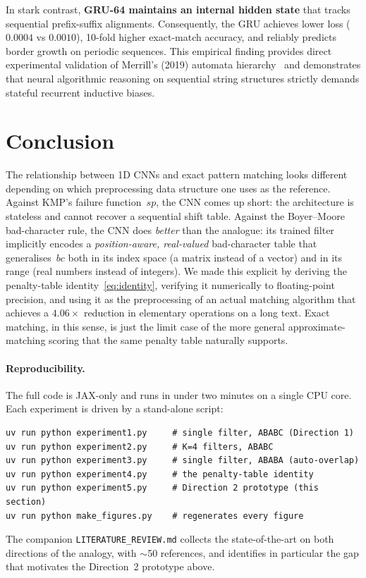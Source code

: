 \documentclass[11pt,a4paper]{article}
\begin{document}
In stark contrast, \textbf{GRU-64 maintains an internal hidden state} that tracks sequential prefix-suffix alignments. Consequently, the GRU achieves lower loss ($0.0004$ vs $0.0010$), 10-fold higher exact-match accuracy, and reliably predicts border growth on periodic sequences. This empirical finding provides direct experimental validation of Merrill's (2019) automata hierarchy~\cite{Merrill2019} and demonstrates that neural algorithmic reasoning on sequential string structures strictly demands stateful recurrent inductive biases.

\section{Conclusion}
\label{sec:concl}

The relationship between 1D CNNs and exact pattern matching looks
different depending on which preprocessing data structure one uses as
the reference. Against KMP's failure function~$sp$, the CNN comes up
short: the architecture is stateless and cannot recover a sequential
shift table. Against the Boyer--Moore bad-character rule, the CNN does
\emph{better} than the analogue: its trained filter implicitly
encodes a \emph{position-aware, real-valued} bad-character table that
generalises~$bc$ both in its index space (a matrix instead of a vector)
and in its range (real numbers instead of integers). We made this
explicit by deriving the penalty-table identity~\eqref{eq:identity},
verifying it numerically to floating-point precision, and using it as
the preprocessing of an actual matching algorithm that achieves a
$4.06\times$ reduction in elementary operations on a long text. Exact
matching, in this sense, is just the limit case of the more general
approximate-matching scoring that the same penalty table naturally
supports.

\paragraph{Reproducibility.}
The full code is JAX-only and runs in under two minutes on a single
CPU core. Each experiment is driven by a stand-alone script:
\begin{verbatim}
uv run python experiment1.py     # single filter, ABABC (Direction 1)
uv run python experiment2.py     # K=4 filters, ABABC
uv run python experiment3.py     # single filter, ABABA (auto-overlap)
uv run python experiment4.py     # the penalty-table identity
uv run python experiment5.py     # Direction 2 prototype (this section)
uv run python make_figures.py    # regenerates every figure
\end{verbatim}
The companion \texttt{LITERATURE\_REVIEW.md} collects the
state-of-the-art on both directions of the analogy, with $\sim$50
references, and identifies in particular the gap that motivates the
Direction~2 prototype above.
\end{document}
